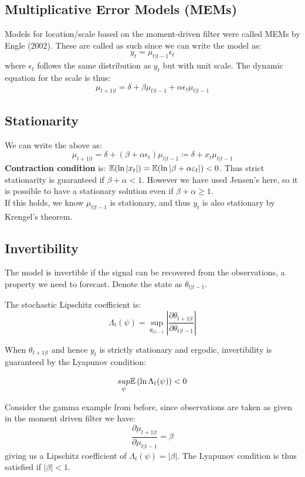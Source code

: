 \documentclass[DIV=14,titlepage=false]{scrreprt}
\begin{document}
\subsection{Multiplicative Error Models (MEMs)}
Models for location/scale based on the moment-driven filter were called MEMs by Engle (2002). These are called as such since we can write the model as:
\[
    y_t = \mu_{t|t-1} \epsilon_t
\]
where $\epsilon_t$ follows the same distribution as $y_t$ but with unit scale. The dynamic equation for the scale is thus:
\[
    \mu_{t+1|t} = \delta + \beta \mu_{t|t-1} + \alpha \epsilon_t \mu_{t|t-1}
\]
\subsection{Stationarity}
We can write the above as:
\[
    \mu_{t+1|t} = \delta + (\beta  + \alpha  \epsilon_t)\mu_{t|t-1} \coloneq \delta + x_t \mu_{t|t-1}
\]
\textbf{Contraction condition} is: $\mathbb{E}(\ln|x_t|) = \mathbb{E}(\ln|\beta + \alpha \varepsilon_t|) < 0$. Thus strict stationarity is guaranteed if $\beta + \alpha < 1$. However we have used Jensen's here, so it is possible to have a stationary solution even if $\beta + \alpha \geq 1$.\\
If this holds, we know $\mu_{t|t-1}$ is stationary, and thus $y_t$ is also stationary by Krengel's theorem.\\
\subsection{Invertibility}
The model is invertible if the signal can be recovered from the observations, a property we need to forecast. Denote the state as $\theta_{t|t-1}$.
\begin{definition}
    The stochastic Lipschitz coefficient is:
    \[
        \Lambda_t(\psi) = \sup_{\theta_{t|t-1}} \left| \frac{\partial \theta_{t+1|t}}{\partial \theta_{t|t-1}} \right|
    \]
\end{definition}

    When $\theta_{t+1|t}$ and hence $y_t$ is strictly stationary and ergodic, invertibility is guaranteed by the Lyapunov condition:
    \begin{definition}
     \[
        \underset{\psi}{sup}\mathbb{E} \left(\ln \Lambda_t(\psi)\right) < 0
     \]
\end{definition}
\begin{example}
    Consider the gamma example from before, since observations are taken as given in the moment driven filter we have:
    \[
        \frac{\partial \mu_{t+1|t}}{\partial \mu_{t|t-1}} = \beta
    \]
    giving us a Lipschitz coefficient of $\Lambda_t(\psi) = |\beta|$. The Lyapunov condition is thus satisfied if $|\beta| < 1$.
    \end{example}
\end{document}
